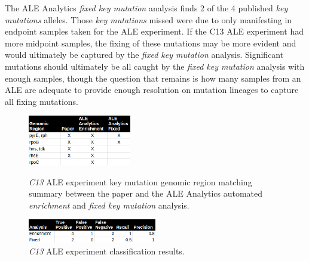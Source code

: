 \documentclass[12pt,final,masters,chapterheads]{ucsd}  %
\newcommand\todo[1]{\textcolor{red}{#1}}
\begin{document}
The ALE Analytics \textit{fixed key mutation} analysis finds 2 of the 4 published \textit{key mutations} alleles. Those \textit{key mutations} missed were due to only manifesting in endpoint samples taken for the ALE experiment. If the C13 ALE experiment had more midpoint samples, the fixing of these mutations may be more evident and would ultimately be captured by the \textit{fixed key mutation} analysis. Significant mutations should ultimately be all caught by the \textit{fixed key mutation} analysis with enough samples, though the question that remains is how many samples from an ALE are adequate to provide enough resolution on mutation lineages to capture all fixing mutations.
\begin{figure}[H]
  \caption{\textit{C13} ALE experiment {key mutation} genomic region matching summary between the paper and the ALE Analytics automated \textit{enrichment} and \textit{fixed key mutation} analysis.}
  \centering
  \includegraphics[width=0.4\textwidth]{c13_key_mutation_regions.png}
  \label{fig:}
\end{figure}
\begin{figure}[H]
  \centering
   \caption{\textit{C13} ALE experiment classification results.}
  \includegraphics[width=0.5\textwidth]{c13_precision_recall.png}
\end{figure}
\end{document}
